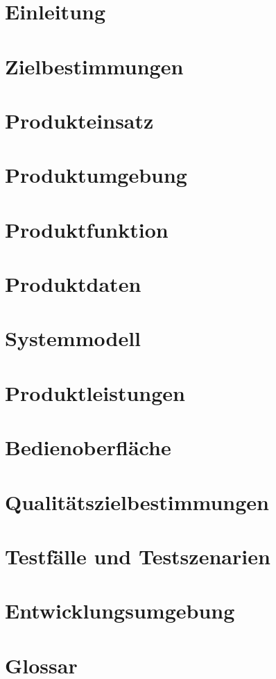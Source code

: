 

	\maketitle
	\setcounter{tocdepth}{1}
	\tableofcontents
	\chapter{Einleitung}
		
	\chapter{Zielbestimmungen}
		
	\chapter{Produkteinsatz}
		
	\chapter{Produktumgebung}
		
	\chapter{Produktfunktion}
		
	\chapter{Produktdaten}
		
	\chapter{Systemmodell}
		
	\chapter{Produktleistungen}
		
	\chapter{Bedienoberfläche}
		
	\chapter{Qualitätszielbestimmungen}
		
	\chapter{Testfälle und Testszenarien}
		
	\chapter{Entwicklungsumgebung}
		
	\chapter{Glossar}
		

